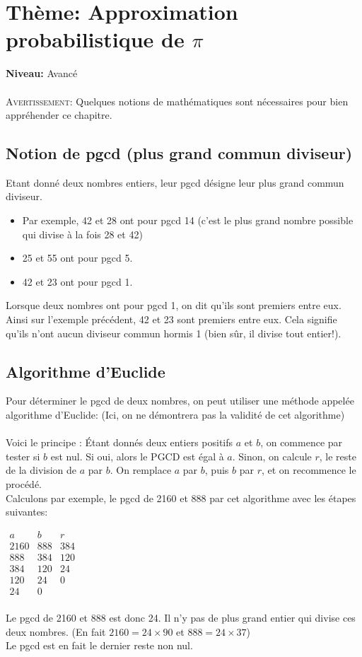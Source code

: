 \chapter{Thème: Approximation probabilistique de $\pi$}
{ }\hfill\textbf{Niveau:} Avancé\\ \\
\noindent \textsc{Avertissement:} Quelques notions de mathématiques sont nécessaires pour bien appréhender ce chapitre.
\section{Notion de pgcd (plus grand commun diviseur)}
\noindent 
Etant donné deux nombres entiers, leur pgcd désigne leur plus grand commun diviseur. \\
\begin{itemize}
\item Par exemple, 42 et 28 ont pour pgcd 14 (c'est le plus grand nombre possible qui divise à la fois 28 et 42)
\item 25 et 55 ont pour pgcd 5.
\item 42 et 23 ont pour pgcd 1.
\end{itemize}
Lorsque deux nombres ont pour pgcd 1, on dit qu'ils sont premiers entre eux. Ainsi sur l'exemple précédent, 42 et 23 sont premiers entre eux. Cela signifie qu'ils n'ont aucun diviseur commun hormis 1 (bien sûr, il divise tout entier!).
\section{Algorithme d'Euclide}
\noindent Pour déterminer le pgcd de deux nombres, on peut utiliser une méthode appelée algorithme d'Euclide: (Ici, on ne démontrera pas la validité de cet algorithme)\\ \\
Voici le principe :
Étant donnés deux entiers positifs $a$ et $b$, on commence par tester si $b$ est nul. Si oui, alors le PGCD est égal à $a$. Sinon, on calcule $r$, le reste de la division de $a$ par $b$. On remplace $a$ par $b$, puis $b$ par $r$, et on recommence le procédé. \\
Calculons par exemple, le pgcd de 2160 et 888  par cet algorithme avec les étapes suivantes:
\begin{center}
$\begin{array}{ccc}
a & b & r\\
2160 & 888 & 384 \\
888 & 384 & 120 \\
384 & 120 & 24 \\
120 & 24 & 0 \\
24 & 0 & \\
\end{array}$
\end{center}
Le pgcd de 2160 et 888 est donc 24. Il n'y pas de plus grand entier qui divise ces deux nombres.
(En fait $2160=24\times90$ et $888=24\times37$)\\
Le pgcd est en fait le dernier reste non nul.
